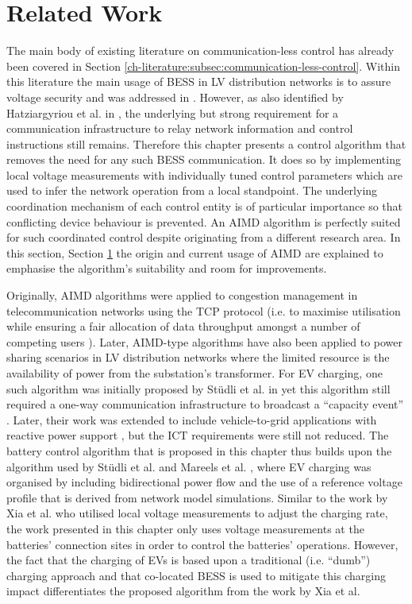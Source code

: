 \section{Related Work}
\label{ch4:sec:related-work}

The main body of existing literature on communication-less control has already been covered in Section \ref{ch-literature:subsec:communication-less-control}.
Within this literature the main usage of BESS in LV distribution networks is to assure voltage security and was addressed in \cite{Sugihara2013, Toledo2013, Marra2013, Mokhtari2013, Atia2016}.
However, as also identified by Hatziargyriou et al. in \cite{Hatziargyriou2015}, the underlying but strong requirement for a communication infrastructure to relay network information and control instructions still remains.
Therefore this chapter presents a control algorithm that removes the need for any such BESS communication.
It does so by implementing local voltage measurements with individually tuned control parameters which are used to infer the network operation from a local standpoint.
The underlying coordination mechanism of each control entity is of particular importance so that conflicting device behaviour is prevented.
An AIMD algorithm is perfectly suited for such coordinated control despite originating from a different research area.
In this section, Section \ref{ch4:sec:related-work} the origin and current usage of AIMD are explained to emphasise the algorithm's suitability and room for improvements.

Originally, AIMD algorithms were applied to congestion management in telecommunication networks using the TCP protocol \cite{Chiu1989} (i.e. to maximise utilisation while ensuring a fair allocation of data throughput amongst a number of competing users \cite{Wirth2014}).
Later, AIMD-type algorithms have also been applied to power sharing scenarios in LV distribution networks where the limited resource is the availability of power from the substation's transformer.
For EV charging, one such algorithm was initially proposed by St{\"{u}}dli et al. in \cite{Studli2012} yet this algorithm still required a one-way communication infrastructure to broadcast a ``capacity event'' \cite{Studli2014, Studli2014a}.
Later, their work was extended to include vehicle-to-grid applications with reactive power support \cite {Studli2015}, but the ICT requirements were still not reduced.
The battery control algorithm that is proposed in this chapter thus builds upon the algorithm used by St{\"{u}}dli et al. and Mareels et al. \cite{Mareels2014}, where EV charging was organised by including bidirectional power flow and the use of a reference voltage profile that is derived from network model simulations.
Similar to the work by Xia et al. \cite{Xia2014} who utilised local voltage measurements to adjust the charging rate, the work presented in this chapter only uses voltage measurements at the batteries' connection sites in order to control the batteries' operations.
However, the fact that the charging of EVs is based upon a traditional (i.e. ``dumb'') charging approach and that co-located BESS is used to mitigate this charging impact differentiates the proposed algorithm from the work by Xia et al.

